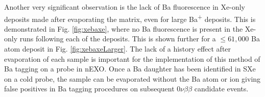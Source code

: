 Another very significant observation is the lack of Ba fluorescence in Xe-only deposits made after evaporating the matrix, even for large Ba\textsuperscript{+} deposits.  This is demonstrated in Fig. \ref{fig:xebaxe}, where no Ba fluorescence is present in the Xe-only runs following each of the deposits.  This is shown further for a $\leq 61,000$ Ba atom deposit in Fig. \ref{fig:xebaxeLarger}.  The lack of a history effect after evaporation of each sample is important for the implementation of this method of Ba tagging on a probe in nEXO.  Once a Ba daughter has been identified in SXe on a cold probe, the sample can be evaporated without the Ba atom or ion giving false positives in Ba tagging procedures on subsequent $0\nu\beta\beta$ candidate events.




